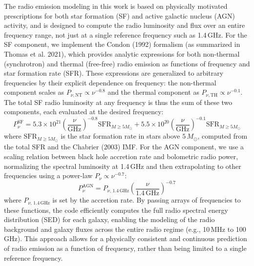 \documentclass[a4paper, 11pt, oneside]{researchjournal} %
\begin{document}
The radio emission modeling in this work is based on physically motivated prescriptions for both star formation (SF) and active galactic nucleus (AGN) activity, and is designed to compute the radio luminosity and flux over an entire frequency range, not just at a single reference frequency such as 1.4\,GHz. For the SF component, we implement the Condon (1992) formalism (as summarized in Thomas et al. 2021), which provides analytic expressions for both non-thermal (synchrotron) and thermal (free-free) radio emission as functions of frequency and star formation rate (SFR). These expressions are generalized to arbitrary frequencies by their explicit dependence on frequency: the non-thermal component scales as $P_{\nu,\mathrm{NT}} \propto \nu^{-0.8}$ and the thermal component as $P_{\nu,\mathrm{TH}} \propto \nu^{-0.1}$. The total SF radio luminosity at any frequency is thus the sum of these two components, each evaluated at the desired frequency:
\begin{equation}
    P_\nu^{\mathrm{SF}} = 5.3 \times 10^{21} \left( \frac{\nu}{\mathrm{GHz}} \right)^{-0.8} \mathrm{SFR}_{M \geq 5 M_\odot} + 5.5 \times 10^{20} \left( \frac{\nu}{\mathrm{GHz}} \right)^{-0.1} \mathrm{SFR}_{M \geq 5 M_\odot}
\end{equation}
where $\mathrm{SFR}_{M \geq 5 M_\odot}$ is the star formation rate in stars above $5\,M_\odot$, computed from the total SFR and the Chabrier (2003) IMF. For the AGN component, we use a scaling relation between black hole accretion rate and bolometric radio power, normalizing the spectral luminosity at 1.4\,GHz and then extrapolating to other frequencies using a power-law $P_\nu \propto \nu^{-0.7}$:
\begin{equation}
    P_\nu^{\mathrm{AGN}} = P_{\nu,\,1.4\,\mathrm{GHz}} \left( \frac{\nu}{1.4\,\mathrm{GHz}} \right)^{-0.7}
\end{equation}
where $P_{\nu,\,1.4\,\mathrm{GHz}}$ is set by the accretion rate. By passing arrays of frequencies to these functions, the code efficiently computes the full radio spectral energy distribution (SED) for each galaxy, enabling the modeling of the radio background and galaxy fluxes across the entire radio regime (e.g., 10\,MHz to 100\,GHz). This approach allows for a physically consistent and continuous prediction of radio emission as a function of frequency, rather than being limited to a single reference frequency.
\end{document}
